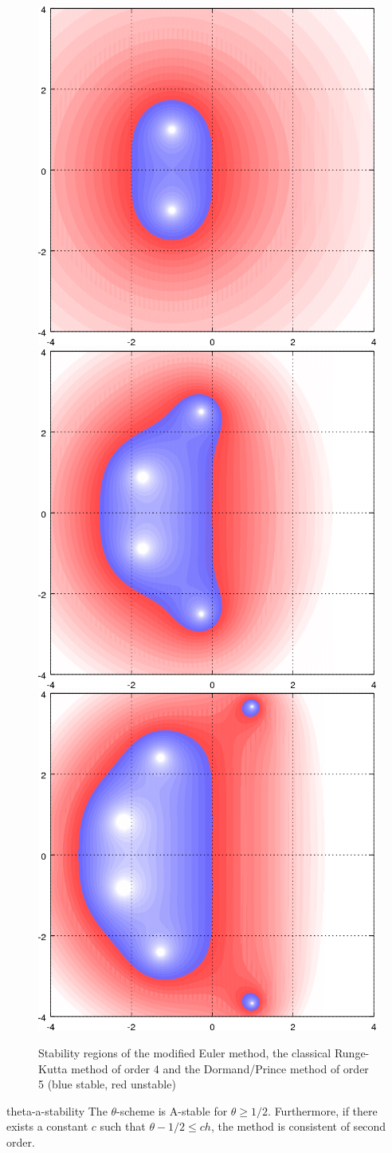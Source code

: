 
\begin{figure}[tp]
  \centering
  \includegraphics[width=.3\textwidth]{fig/stability-RK2}
  \hfill
  \includegraphics[width=.3\textwidth]{fig/stability-RK4}
  \hfill
  \includegraphics[width=.3\textwidth]{fig/stability-DOPRI5}
  \caption{Stability regions of the modified Euler method, the
    classical Runge-Kutta method of order 4 and the Dormand/Prince
    method of order 5 (blue stable, red unstable)}
  \label{fig:implicit:stability-explicit-rk}
\end{figure}



\begin{Theorem}{theta-a-stability}
  The $\theta$-scheme is A-stable for $\theta\ge 1/2$. Furthermore, if
  there exists a constant $c$ such that $\theta-1/2 \le ch$, the
  method is consistent of second order.
\end{Theorem}

